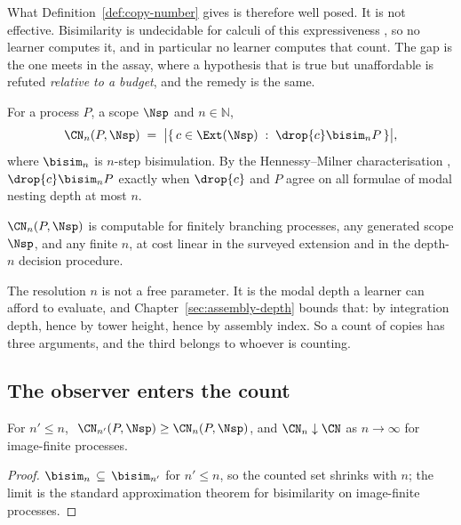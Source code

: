 What Definition~\ref{def:copy-number} gives is therefore well posed. It is
not effective. Bisimilarity is undecidable for calculi of this
expressiveness \cite{sangiorgi}, so no learner computes it, and in
particular no learner computes that count. The gap is the one \chSci meets
in the assay, where a hypothesis that is true but unaffordable is refuted
\emph{relative to a budget}, and the remedy is the same.

\begin{definition}
\label{scm:def:cnn}
For a process $P$, a scope $\Nsp$ and $n \in \mathbb{N}$,
\[
  \CN_n(P, \Nsp) \;=\;
  \bigl|\{\, c \in \Ext(\Nsp) \;:\; \drop{c} \bisim_n P \,\}\bigr|,
\]
where $\bisim_n$ is $n$-step bisimulation. By the Hennessy--Milner
characterisation \cite{HennessyMilner1985}, $\drop{c} \bisim_n P$ exactly
when $\drop{c}$ and $P$ agree on all formulae of modal nesting depth at
most $n$.
\end{definition}

\begin{proposition}[Effectivity]
\label{scm:prop:effective}
$\CN_n(P,\Nsp)$ is computable for finitely branching processes, any
generated scope $\Nsp$, and any finite $n$, at cost linear in the surveyed
extension and in the depth-$n$ decision procedure.
\end{proposition}

The resolution $n$ is not a free parameter. It is the modal depth a
learner can afford to evaluate, and Chapter~\ref{sec:assembly-depth}
bounds that: by integration depth, hence by tower height, hence by
assembly index. So a count of copies has three arguments, and the third
belongs to whoever is counting.

\subsection{The observer enters the count}

\begin{proposition}
\label{scm:prop:mono}
For $n' \le n$, $\ \CN_{n'}(P,\Nsp) \ge \CN_n(P,\Nsp)$, and
$\CN_n \downarrow \CN$ as $n \to \infty$ for image-finite processes.
\end{proposition}

\begin{proof}
$\bisim_n \,\subseteq\, \bisim_{n'}$ for $n' \le n$, so the counted set
shrinks with $n$; the limit is the standard approximation theorem for
bisimilarity on image-finite processes.
\end{proof}

